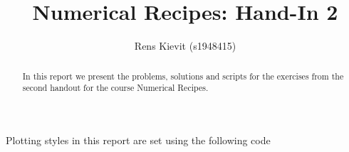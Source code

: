 \documentclass[a4paper,10pt]{article}
\title{Numerical Recipes: Hand-In 2}
\author{Rens Kievit (s1948415)}
\begin{document}
\maketitle

\begin{abstract}
    In this report we present the problems, solutions and scripts for the exercises from the second handout for the course Numerical Recipes.
\end{abstract}

Plotting styles in this report are set using the following code





\end{document}
